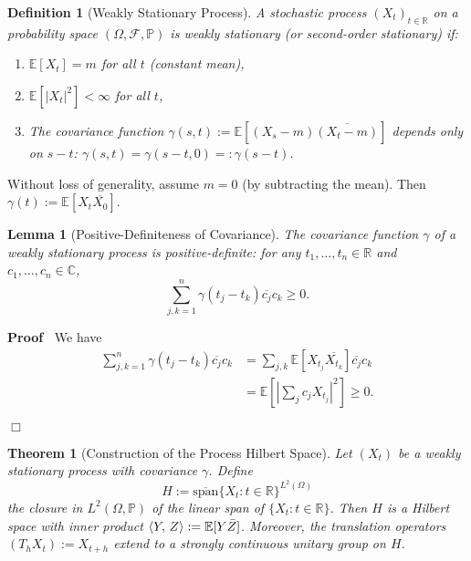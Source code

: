 \documentclass{article}
\newcommand{\assign}{:=}
\newcommand{\tmem}[1]{{\em #1\/}}
\newenvironment{proof}{\noindent\textbf{Proof\ }}{\hspace*{\fill}$\Box$\medskip}
\newtheorem{definition}{Definition}
\newtheorem{lemma}{Lemma}
\newtheorem{theorem}{Theorem}
\newcommand{\C}{\mathbb{C}}
\newcommand{\R}{\mathbb{R}}
\newcommand{\E}{\mathbb{E}}
\newcommand{\Prob}{\mathbb{P}}
\newcommand{\1}{\mathbbm{1}}
\newcommand{\ip}[2]{\left\langle #1, \hspace{0.17em} #2  \right\rangle}
\begin{document}
\begin{definition}
  [Weakly Stationary Process] A stochastic process $(X_t)_{t \in \R}$ on a
  probability space $(\Omega, \mathcal{F}, \Prob)$ is {\tmem{weakly
  stationary}} (or {\tmem{second-order stationary}}) if:
  \begin{enumerate}
    \item $\E [X_t] = m$ for all $t$ (constant mean),
    
    \item $\E [|X_t |^2] < \infty$ for all $t$,
    
    \item The covariance function $\gamma (s, t) \assign \E [(X_s - m)
    \overline{(X_t - m)}]$ depends only on $s - t$: $\gamma (s, t) = \gamma (s
    - t, 0) = : \gamma (s - t)$.
  \end{enumerate}
\end{definition}

Without loss of generality, assume $m = 0$ (by subtracting the mean). Then
$\gamma (t) \assign \E [X_t \overline{X_0}]$.

\begin{lemma}
  [Positive-Definiteness of Covariance]\label{lem:covariance_pd} The
  covariance function $\gamma$ of a weakly stationary process is
  positive-definite: for any $t_1, \ldots, t_n \in \R$ and $c_1, \ldots, c_n
  \in \C$,
  \[ \sum_{j, k = 1}^n \gamma (t_j - t_k) \overline{c_j} c_k \geq 0. \]
\end{lemma}

\begin{proof}
  We have
  \begin{equation}
    \begin{array}{ll}
      \sum_{j, k = 1}^n \gamma (t_j - t_k) \overline{c_j} c_k & = \sum_{j, k}
      \E [X_{t_j} \overline{X_{t_k}}] \overline{c_j} c_k\\
      & = \E \left[ \left| \sum_j c_j X_{t_j} \right|^2 \right] \geq 0.
    \end{array}
  \end{equation}
  
\end{proof}

\begin{theorem}
  [Construction of the Process Hilbert Space]\label{thm:process_hilbert} Let
  $(X_t)$ be a weakly stationary process with covariance $\gamma$. Define
  \begin{equation}
    H \assign \overline{\text{span}} \{X_t : t \in \R \}^{L^2 (\Omega)}
  \end{equation}
  the closure in $L^2 (\Omega, \Prob)$ of the linear span of $\{X_t : t \in \R
  \}$. Then $H$ is a Hilbert space with inner product $\ip{Y}{Z} \assign \E [Y
  \bar{Z}]$. Moreover, the translation operators $(T_h X_t) \assign X_{t + h}$
  extend to a strongly continuous unitary group on $H$.
\end{theorem}
\end{document}
